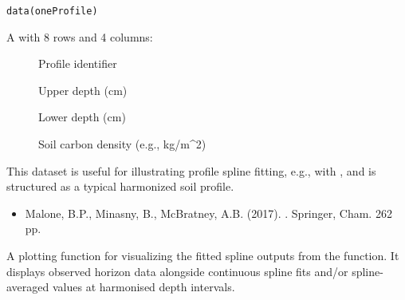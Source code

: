 \documentclass[a4paper]{book}
\begin{document}
\begin{Usage}
\begin{verbatim}
data(oneProfile)
\end{verbatim}
\end{Usage}
%
\begin{Format}
A  with 8 rows and 4 columns:
\begin{description}

\item[] Profile identifier
\item[] Upper depth (cm)
\item[] Lower depth (cm)
\item[] Soil carbon density (e.g., kg/m\textasciicircum{}2)

\end{description}

\end{Format}
%
\begin{Details}
This dataset is useful for illustrating profile spline fitting, e.g., with , and is structured as a typical harmonized soil profile.
\end{Details}
%
\begin{References}
\begin{itemize}

\item{} Malone, B.P., Minasny, B., McBratney, A.B. (2017). . Springer, Cham. 262 pp.

\end{itemize}

\end{References}
%
\begin{Examples}
\end{Examples}
%
\begin{Description}
A plotting function for visualizing the fitted spline outputs from the  function. It displays observed horizon data alongside continuous spline fits and/or spline-averaged values at harmonised depth intervals.
\end{Description}
\end{document}
